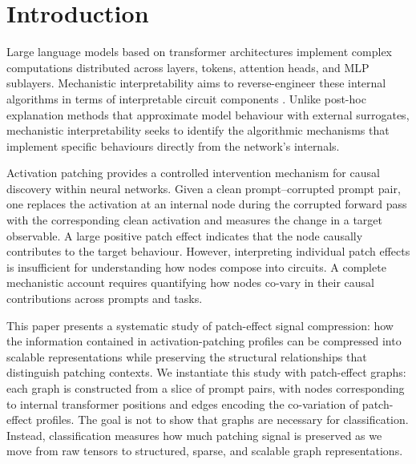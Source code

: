 \documentclass[11pt,a4paper]{article}
\begin{document}
\section{Introduction}

Large language models based on transformer architectures \cite{vaswani2017attention,radford2019language} implement complex computations distributed across layers, tokens, attention heads, and MLP sublayers. Mechanistic interpretability aims to reverse-engineer these internal algorithms in terms of interpretable circuit components \cite{elhage2021transformer}. Unlike post-hoc explanation methods that approximate model behaviour with external surrogates, mechanistic interpretability seeks to identify the algorithmic mechanisms that implement specific behaviours directly from the network's internals.

Activation patching \cite{narang2022causal, wang2023localizing} provides a controlled intervention mechanism for causal discovery within neural networks. Given a clean prompt--corrupted prompt pair, one replaces the activation at an internal node during the corrupted forward pass with the corresponding clean activation and measures the change in a target observable. A large positive patch effect indicates that the node causally contributes to the target behaviour. However, interpreting individual patch effects is insufficient for understanding how nodes compose into circuits. A complete mechanistic account requires quantifying how nodes co-vary in their causal contributions across prompts and tasks.

This paper presents a systematic study of patch-effect signal compression: how the information contained in activation-patching profiles can be compressed into scalable representations while preserving the structural relationships that distinguish patching contexts. We instantiate this study with patch-effect graphs: each graph is constructed from a slice of prompt pairs, with nodes corresponding to internal transformer positions and edges encoding the co-variation of patch-effect profiles. The goal is not to show that graphs are necessary for classification. Instead, classification measures how much patching signal is preserved as we move from raw tensors to structured, sparse, and scalable graph representations.
\end{document}
